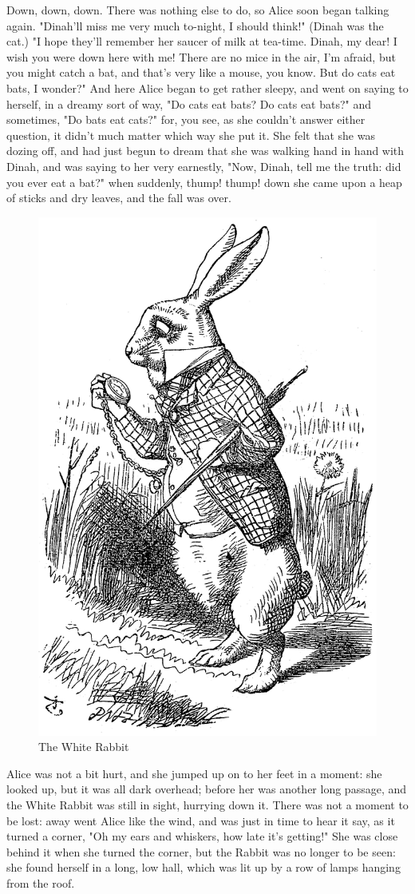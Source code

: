 \documentclass[aps,prb,amsmath,twocolumn,amssymb,titlepage]{revtex4-2}
\begin{document}
Down, down, down. There was nothing else to do, so Alice soon began talking again. "Dinah'll miss me very much to-night, I should think!" (Dinah was the cat.) "I hope they'll remember her saucer of milk at tea-time. Dinah, my dear! I wish you were down here with me! There are no mice in the air, I'm afraid, but you might catch a bat, and that's very like a mouse, you know. But do cats eat bats, I wonder?" And here Alice began to get rather sleepy, and went on saying to herself, in a dreamy sort of way, "Do cats eat bats? Do cats eat bats?" and sometimes, "Do bats eat cats?" for, you see, as she couldn't answer either question, it didn't much matter which way she put it. She felt that she was dozing off, and had just begun to dream that she was walking hand in hand with Dinah, and was saying to her very earnestly, "Now, Dinah, tell me the truth: did you ever eat a bat?" when suddenly, thump! thump! down she came upon a heap of sticks and dry leaves, and the fall was over.

\begin{figure}[h]
  \includegraphics[width=.45\textwidth]{images/rabbit.png}
  \caption{The White Rabbit}
  \label{rabbit}
\end{figure}

Alice was not a bit hurt, and she jumped up on to her feet in a moment: she looked up, but it was all dark overhead; before her was another long passage, and the White Rabbit was still in sight, hurrying down it. There was not a moment to be lost: away went Alice like the wind, and was just in time to hear it say, as it turned a corner, "Oh my ears and whiskers, how late it's getting!" She was close behind it when she turned the corner, but the Rabbit was no longer to be seen: she found herself in a long, low hall, which was lit up by a row of lamps hanging from the roof.
\end{document}
